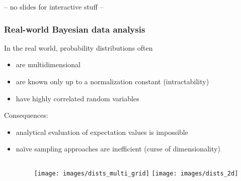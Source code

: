 \documentclass[t,aspectratio=169]{beamer}
\newcommand{\todo}{\textcolor{red}{\textbf{TODO}}}
\begin{document}
\begin{frame}
  \centering
  \vfill
  \Huge-- no slides for interactive stuff --
  \vfill
\end{frame}




\def\tikzoverlay{%
   \tikz[baseline,overlay]\node[every overlay node]
}%


\begin{frame}
  \frametitle{Real-world Bayesian data analysis}
  In the real world, probability distributions often
  \begin{itemize}
  \item are multidimensional
  \item are known only up to a normalization constant (intractability)
  \item have highly correlated random variables
  \end{itemize}
  Consequences:
  \begin{itemize}
  \item analytical evaluation of expectation values is impossible
  \item naïve sampling approaches are inefficient (curse of dimensionality)
  \end{itemize}
  \begin{columns}
    \begin{column}{0.33\textwidth}
    \end{column}
    \begin{column}{0.63\textwidth}
      \texttt{[image: images/dists\_multi\_grid]}
      \texttt{[image: images/dists\_2d]}
      
    \end{column}
  \end{columns}
\end{frame}
\end{document}
